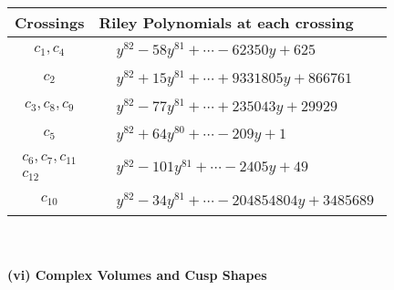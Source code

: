 \documentclass[1p]{elsarticle_modified}
\theoremstyle{definition}
\begin{document}
\begin{tabular}{m{50pt}|m{274pt}}
Crossings & \hspace{64pt}Riley Polynomials at each crossing \\
\hline $$\begin{aligned}c_{1},c_{4}\end{aligned}$$&$\begin{aligned}
&y^{82}-58 y^{81}+\cdots-62350 y+625
\end{aligned}$\\
\hline $$\begin{aligned}c_{2}\end{aligned}$$&$\begin{aligned}
&y^{82}+15 y^{81}+\cdots+9331805 y+866761
\end{aligned}$\\
\hline $$\begin{aligned}c_{3},c_{8},c_{9}\end{aligned}$$&$\begin{aligned}
&y^{82}-77 y^{81}+\cdots+235043 y+29929
\end{aligned}$\\
\hline $$\begin{aligned}c_{5}\end{aligned}$$&$\begin{aligned}
&y^{82}+64 y^{80}+\cdots-209 y+1
\end{aligned}$\\
\hline $$\begin{aligned}c_{6},c_{7},c_{11}\\c_{12}\end{aligned}$$&$\begin{aligned}
&y^{82}-101 y^{81}+\cdots-2405 y+49
\end{aligned}$\\
\hline $$\begin{aligned}c_{10}\end{aligned}$$&$\begin{aligned}
&y^{82}-34 y^{81}+\cdots-204854804 y+3485689
\end{aligned}$\\
\hline
\end{tabular}\\~\\
\newpage\flushleft \textbf{(vi) Complex Volumes and Cusp Shapes}
\end{document}
